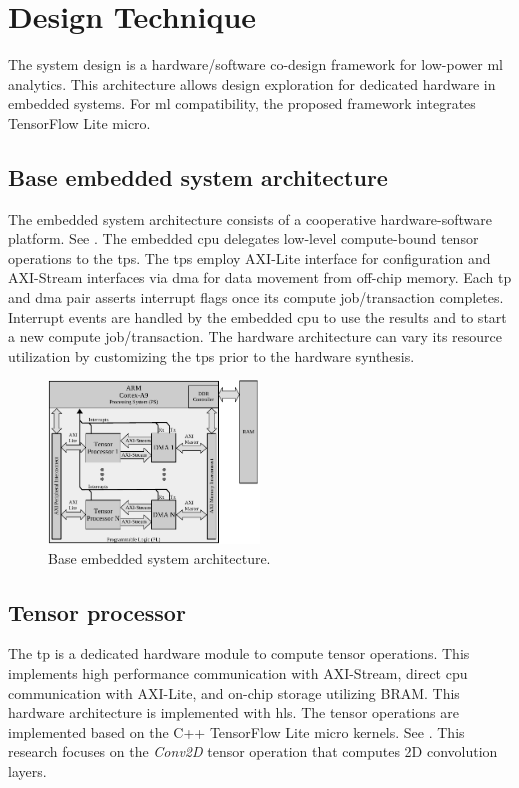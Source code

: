 \section{Design Technique}
\label{sec:system_design}
The system design is a hardware/software co-design framework for low-power \gls{ml} analytics. This architecture allows design exploration for dedicated hardware in embedded systems. For \gls{ml} compatibility, the proposed framework integrates TensorFlow Lite micro.

\subsection{Base embedded system architecture}
The embedded system architecture consists of a cooperative hardware-software platform. See . The embedded \gls{cpu} delegates low-level compute-bound tensor operations to the \glspl{tp}. The \glspl{tp} employ AXI-Lite interface for configuration and AXI-Stream interfaces via \gls{dma} for data movement from off-chip memory. Each \gls{tp} and \gls{dma} pair asserts interrupt flags once its compute job/transaction completes. Interrupt events are handled by the embedded \gls{cpu} to use the results and to start a new compute job/transaction. The hardware architecture can vary its resource utilization by customizing the \glspl{tp} prior to the hardware synthesis.
\begin{figure}[h!]
	\centering
	\includegraphics[width=0.5\textwidth]{./chapters/cnn_accelerator/figures/system_design.pdf}
	\caption{Base embedded system architecture.}
	\label{fig:system_architecture}
\end{figure}
\subsection{Tensor processor}
The \gls{tp} is a dedicated hardware module to compute tensor operations. This implements high performance communication with AXI-Stream, direct \gls{cpu} communication with AXI-Lite, and on-chip storage utilizing BRAM. This hardware architecture is implemented with \gls{hls}. The tensor operations are implemented based on the C++ TensorFlow Lite micro kernels. See . This research focuses on the \emph{Conv2D} tensor operation that computes 2D convolution layers.

